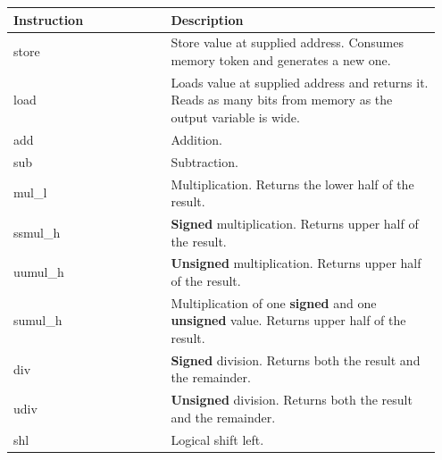 \documentclass[course=eragp]{aspdoc}
\begin{document}
\begin{center}
    \begin{longtable}{p{0.35\linewidth} | p{0.6\linewidth}}
        \hline
        Instruction  & Description                                                                                                                \\ [0.5ex]
        \hline
        store        & Store value at supplied address. Consumes memory token and generates a new one.                                            \\
        \hline
        load         & Loads value at supplied address and returns it. Reads as many bits from memory as the output
        variable is wide.                                                                                                                         \\
        \hline
        add          & Addition.                                                                                                                  \\
        \hline
        sub          & Subtraction.                                                                                                               \\
        \hline
        mul\_l       & Multiplication. Returns the lower half of the result.                                                                      \\
        \hline
        ssmul\_h     & \textbf{Signed} multiplication. Returns upper half of the result.                                                          \\
        \hline
        uumul\_h     & \textbf{Unsigned} multiplication. Returns upper half of the result.                                                        \\
        \hline
        sumul\_h     & Multiplication of one \textbf{signed} and one \textbf{unsigned} value. Returns upper half of the result.                   \\
        \hline
        div          & \textbf{Signed} division. Returns both the result and the remainder.                                                       \\
        \hline
        udiv         & \textbf{Unsigned} division. Returns both the result and the remainder.                                                     \\
        \hline
        shl          & Logical shift left.                                                                                                        \\

\end{longtable}
\end{center}
\end{document}
